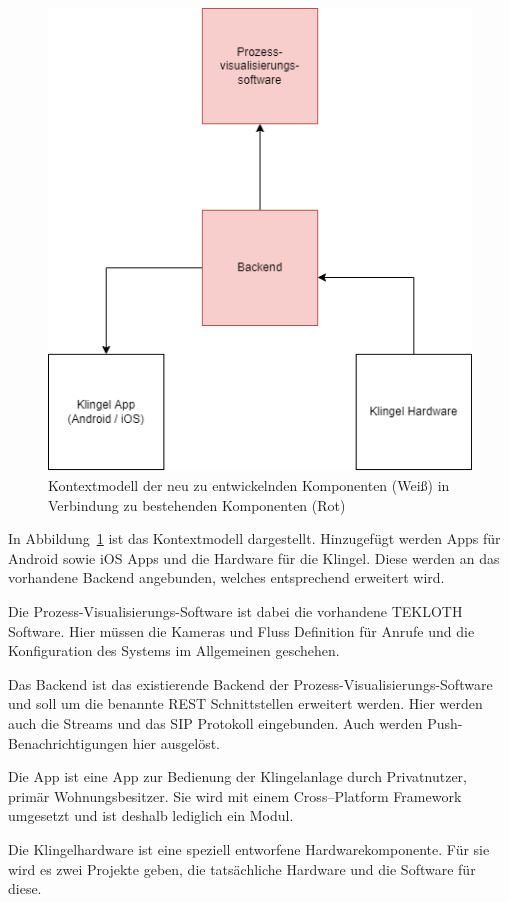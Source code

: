 \begin{figure}[ht!]
    \centering\includegraphics[width=\paperwidth/2]{../assets/img/kontextmodell}

    \caption{Kontextmodell der neu zu entwickelnden Komponenten (Weiß) in Verbindung zu bestehenden Komponenten (Rot)}
    \label{fig:kontextmodell}
\end{figure}
In Abbildung~\ref{fig:kontextmodell} ist das Kontextmodell dargestellt.
Hinzugefügt werden Apps für Android sowie iOS Apps und die Hardware für die Klingel.
Diese werden an das vorhandene Backend angebunden, welches entsprechend erweitert wird.


Die Prozess-Visualisierungs-Software ist dabei die vorhandene TEKLOTH Software.
Hier müssen die Kameras und Fluss Definition für Anrufe und die Konfiguration des Systems im Allgemeinen geschehen.


Das Backend ist das existierende Backend der Prozess-Visualisierungs-Software und soll um die benannte REST Schnittstellen erweitert werden.
Hier werden auch die Streams und das SIP Protokoll eingebunden.
Auch werden Push-Benachrichtigungen hier ausgelöst.


Die App ist eine App zur Bedienung der Klingelanlage durch Privatnutzer, primär Wohnungsbesitzer.
Sie wird mit einem Cross--Platform Framework umgesetzt und ist deshalb lediglich ein Modul.


Die Klingelhardware ist eine speziell entworfene Hardwarekomponente.
Für sie wird es zwei Projekte geben, die tatsächliche Hardware und die Software für diese.
